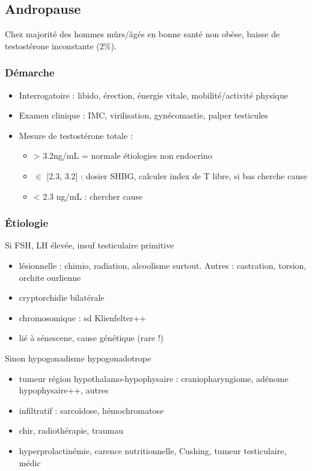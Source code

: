 \documentclass[11pt]{article}
\begin{document}
\subsection{Andropause}
\label{sec:orgc9cecf6}
Chez majorité des hommes mûrs/âgés en bonne santé non obèse, baisse de
testostérone inconstante (2\%).

\subsubsection{Démarche}
\label{sec:org6b97fc7}
\begin{itemize}
\item Interrogatoire : libido, érection, énergie vitale, mobilité/activité physique
\item Examen clinique : IMC, virilisation, gynécomastie, palper testicules
\item Mesure de testostérone totale :
\begin{itemize}
\item > 3.2ng/mL = normale \thus étiologies non endocrino
\item \(\in\) [2.3, 3.2] : dosier SHBG, calculer index de T libre, si bas cherche cause
\item < 2.3 ng/mL : chercher cause
\end{itemize}
\end{itemize}
\subsubsection{Étiologie}
\label{sec:orgf36564a}
Si FSH, LH élevée, insuf testiculaire primitive 
\begin{itemize}
\item lésionnelle : chimio, radiation, alcoolisme surtout. Autres : castration,
torsion, orchite ourlienne
\item cryptorchidie bilatérale
\item chromosomique : sd Klienfelter++
\item lié à sénescene, cause génétique (rare !)
\end{itemize}
Sinon hypogonadisme hypogonadotrope 
\begin{itemize}
\item tumeur région hypothalamo-hypophysaire : craniopharyngiome, adénome
hypophysaire++, autres
\item infiltratif : sarcoïdose, hémochromatose
\item chir, radiothérapie, traumau
\item hyperprolactinémie, carence nutritionnelle, Cushing, tumeur testiculaire, médic
\end{itemize}
\end{document}
